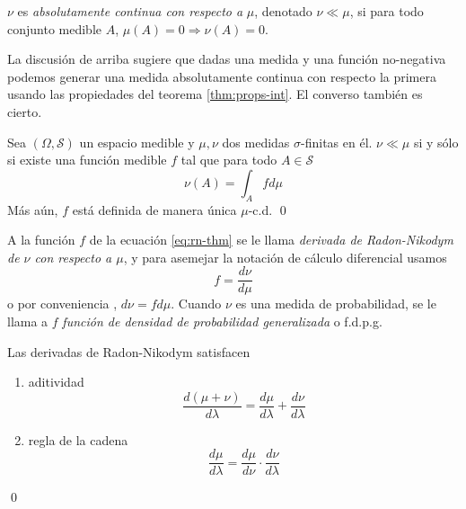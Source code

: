 \documentclass[main.tex]{subfiles}
\begin{document}
\begin{definition}
$\nu$ es \textit{absolutamente continua con respecto a} $\mu$, denotado $\nu \ll \mu$, si para todo conjunto medible $A$, $\mu(A)=0 \Rightarrow \nu(A)=0$. 
\end{definition}

La discusión de arriba sugiere que dadas una medida y una función no-negativa podemos generar una medida absolutamente continua con respecto la primera usando las propiedades del teorema \ref{thm:props-int}. El converso también es cierto.

\begin{theorem}
Sea $(\Omega, \mathcal{S})$ un espacio medible y $\mu, \nu$ dos medidas $\sigma$-finitas en él. $\nu \ll \mu$ si y sólo si existe una función medible $f$ tal que para todo $A \in \mathcal{S}$
\begin{equation}\label{eq:rn-thm}
	\nu(A) = \int_A f d\mu
\end{equation}
Más aún, $f$ está definida de manera única $\mu$-c.d. \qed
\end{theorem}

\begin{definition}
A la función $f$ de la ecuación \eqref{eq:rn-thm} se le llama \textit{derivada de Radon-Nikodym de $\nu$ con respecto a $\mu$}, y para asemejar la notación de cálculo diferencial usamos 
\begin{equation*}
f = \frac{d\nu}{d\mu}	
\end{equation*}
o por conveniencia , $d\nu = fd\mu$. Cuando $\nu$ es una medida de probabilidad, se le llama a $f$ \textit{función de densidad de probabilidad generalizada} o f.d.p.g.
\end{definition}

\begin{prop}\label{thm:props-rn}
Las derivadas de Radon-Nikodym satisfacen
\begin{enumerate}[label=\roman*.]
	\item aditividad
		\begin{equation*}
			\frac{d(\mu+\nu)}{d\lambda} = \frac{d\mu}{d\lambda}+\frac{d\nu}{d\lambda}
		\end{equation*}
	\item regla de la cadena
		\begin{equation*}
			\frac{d\mu}{d\lambda} = \frac{d\mu}{d\nu}\cdot\frac{d\nu}{d\lambda}
		\end{equation*}
\end{enumerate}
\qed
\end{prop}
\end{document}
